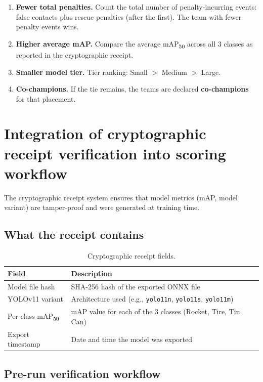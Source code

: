 \documentclass[a4]{article}
\begin{document}
\begin{enumerate}
    \item \textbf{Fewer total penalties.} Count the total number of penalty-incurring events: false contacts plus rescue penalties (after the first). The team with fewer penalty events wins.

    \item \textbf{Higher average mAP.} Compare the average mAP\textsubscript{50} across all 3 classes as reported in the cryptographic receipt.

    \item \textbf{Smaller model tier.} Tier ranking: Small $>$ Medium $>$ Large.

    \item \textbf{Co-champions.} If the tie remains, the teams are declared \textbf{co-champions} for that placement.
\end{enumerate}

\section*{Integration of cryptographic receipt verification into scoring workflow}
The cryptographic receipt system ensures that model metrics (mAP, model variant) are tamper-proof and were generated at training time.

\subsection*{What the receipt contains}

\begin{table}[H]
\centering
\begin{tabular}{ll}
\toprule
\textbf{Field} & \textbf{Description} \\
\midrule
Model file hash & SHA-256 hash of the exported ONNX file \\
YOLOv11 variant & Architecture used (e.g., \texttt{yolo11n}, \texttt{yolo11s}, \texttt{yolo11m}) \\
Per-class mAP\textsubscript{50} & mAP value for each of the 3 classes (Rocket, Tire, Tin Can) \\
Export timestamp & Date and time the model was exported \\
\bottomrule
\end{tabular}
\caption{Cryptographic receipt fields.}
\end{table}

\subsection*{Pre-run verification workflow}
\end{document}
